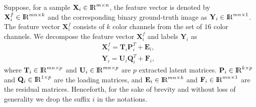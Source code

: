 Suppose, for a sample $\mathbf{X}_{i} \in {\rm I\!R}^{m \times n}$, the feature vector is denoted by $\mathbf{X}^{f}_{i} \in {\rm I\!R}^{mn \times k}$ and the corresponding binary ground-truth image as $\mathbf{Y}_{i} \in {\rm I\!R}^{mn \times 1}$.  The feature vector $\mathbf{X}^{f}_{i}$ consists of $k$ color channels from the set of $16$ color channels. We decompose the feature vector $\mathbf{X}^{f}_{i}$ and labels $\mathbf{Y}_{i}$ as 
\begin{align}
\mathbf{X}^{f}_{i} = \mathbf{T}_{i}\mathbf{P}_{i}^{T} + \mathbf{E}_{i},\\
\mathbf{Y}_{i} = \mathbf{U}_{i}\mathbf{Q}_{i}^{T} + \mathbf{F}_{i},
\label{eq:pls1}
\end{align}
where $\mathbf{T}_{i} \in {\rm I\!R}^{mn \times p}$ and $\mathbf{U}_{i} \in {\rm I\!R}^{mn \times p}$ are $p$ extracted latent matrices.  $\mathbf{P}_{i} \in {\rm I\!R}^{k \times p}$ and $\mathbf{Q}_{i} \in {\rm I\!R}^{1 \times p}$ are the loading matrices, and $\mathbf{E}_{i} \in {\rm I\!R}^{mn \times k}$ and $\mathbf{F}_{i} \in {\rm I\!R}^{mn \times 1}$ are the residual matrices. Henceforth, for the sake of brevity and without loss of generality we drop the suffix $i$ in the notations. 

